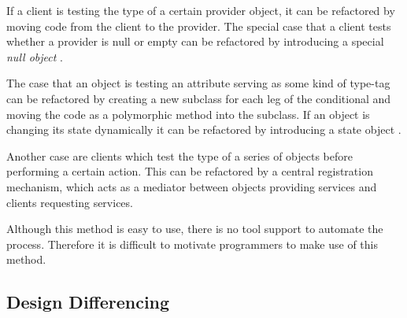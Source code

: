\documentclass[conference,compsoc,a4paper]{IEEEtran}
\newcommand{\code}[1]{{\small\ttfamily #1}}
\begin{document}
If a client is testing the type of a certain provider object, it can be refactored by moving code from the client to 
the provider. The special case that a client tests whether a provider is \code{null} or empty can be refactored by 
introducing a special \emph{null object} \cite{nullobject}.

The case that an object is testing an attribute serving as some kind of type-tag can be refactored by creating a new 
subclass for each leg of the conditional and moving the code as a polymorphic method into the subclass. If an object is 
changing its state dynamically it can be refactored by introducing a state object \cite[pp.~305--313]{designpatterns}.

Another case are clients which test the type of a series of objects before performing a certain action. This can be 
refactored by a central registration mechanism, which acts as a mediator between objects providing services and clients 
requesting services.

Although this method is easy to use, there is no tool support to automate the process. Therefore it is difficult to 
motivate programmers to make use of this method.

\subsection{Design Differencing} \label{sec:design-diff}
\end{document}
